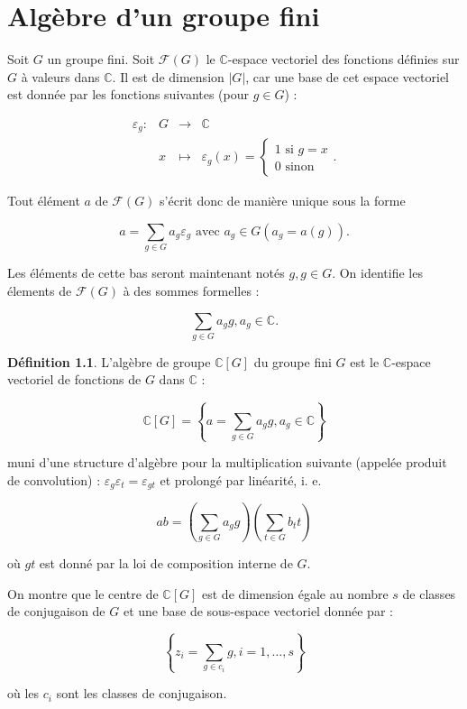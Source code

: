 \documentclass[french]{book}
\theoremstyle{definition}
\newtheorem{protodefinition}{Définition}[section]
\newenvironment{definition}
    {\colorlet{shadecolor}{green!5}\begin{shaded}\begin{protodefinition}}
    {\end{protodefinition}\end{shaded}}
\theoremstyle{remark}
\begin{document}
\chapter{Algèbre d'un groupe fini}

Soit \(G\) un groupe fini. Soit \(\mathscr{F}(G)\) le \(\mathbb{C}\)-espace vectoriel des fonctions définies sur \(G\) à valeurs dans \(\mathbb{C}\). Il est de dimension \(\left\lvert G \right\rvert\), car une base de cet espace vectoriel est donnée par les fonctions suivantes (pour \(g \in G\)) :

\[\begin{matrix}
\varepsilon_g : & G & \longrightarrow & \mathbb{C} \\
\ & x & \longmapsto & \varepsilon_g(x) = \begin{cases}
  1 \text{ si } g = x \\
  0 \text{ sinon }
\end{cases}.
\end{matrix}\]

Tout élément \(a\) de \(\mathscr{F}(G)\) s'écrit donc de manière unique sous la forme

\[a = \sum_{g \in G} a_g \varepsilon_g \text{ avec } a_g \in G (a_g = a(g)).\]

Les éléments de cette bas seront maintenant notés \(g, g \in G\). On identifie les élements de \(\mathscr{F}(G)\) à des sommes formelles :

\[\sum_{g \in G} a_g g, a_g \in \mathbb{C}.\]

\begin{definition}
  L'algèbre de groupe \(\mathbb{C}[G]\) du groupe fini \(G\) est le \(\mathbb{C}\)-espace vectoriel de fonctions de \(G\) dans \(\mathbb{C}\) :

  \[\mathbb{C}[G] = \left\{ a =\sum_{g \in G} a_g g, a_g \in \mathbb{C}\right\}\]

  muni d'une structure d'algèbre pour la multiplication suivante (appelée produit de convolution) : \(\varepsilon_g \varepsilon_t = \varepsilon _{gt}\) et prolongé par linéarité, i. e.

  \[ab = \left(\sum_{g \in G} a_g g \right) \left(\sum_{t \in G} b_t t \right)\]

  où \(gt\) est donné par la loi de composition interne de \(G\).
\end{definition}

On montre que le centre de \(\mathbb{C}[G]\) est de dimension égale au nombre \(s\) de classes de conjugaison de \(G\) et une base de sous-espace vectoriel donnée par :

\[\left\{ z_i = \sum_{g  \in c_i}g, i=1, \dots, s \right\}\]

où les \(c_i\) sont les classes de conjugaison.
\end{document}
